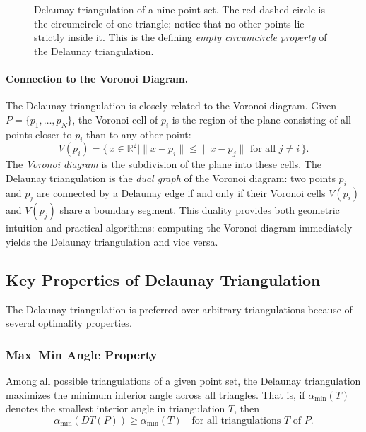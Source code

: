 \begin{figure}[htbp]
    \caption{Delaunay triangulation of a nine-point set.  The red dashed circle
    is the circumcircle of one triangle; notice that no other points lie
    strictly inside it.  This is the defining \emph{empty circumcircle property}
    of the Delaunay triangulation.}
    \label{fig:delaunay-circumcircle}
\end{figure}

\paragraph{Connection to the Voronoi Diagram.}
The Delaunay triangulation is closely related to the Voronoi diagram.
Given $P = \{p_1, \dots, p_N\}$, the Voronoi cell of $p_i$ is the region of
the plane consisting of all points closer to $p_i$ than to any other point:
\[
    V(p_i) = \{\, x \in \mathbb{R}^2 \mid \|x - p_i\| \leq \|x - p_j\|
    \text{ for all } j \neq i \,\}.
\]
The \emph{Voronoi diagram} is the subdivision of the plane into these cells.
The Delaunay triangulation is the \emph{dual graph} of the Voronoi diagram:
two points $p_i$ and $p_j$ are connected by a Delaunay edge if and only if
their Voronoi cells $V(p_i)$ and $V(p_j)$ share a boundary segment.  This
duality provides both geometric intuition and practical algorithms: computing
the Voronoi diagram immediately yields the Delaunay triangulation and vice versa.

\subsection{Key Properties of Delaunay Triangulation}

The Delaunay triangulation is preferred over arbitrary triangulations because
of several optimality properties.

\subsubsection*{Max--Min Angle Property}

\begin{theorem}
    Among all possible triangulations of a given point set, the Delaunay
    triangulation maximizes the minimum interior angle across all triangles.
    That is, if $\alpha_{\min}(T)$ denotes the smallest interior angle in
    triangulation $T$, then
    \[
        \alpha_{\min}(DT(P)) \geq \alpha_{\min}(T)
        \quad \text{for all triangulations } T \text{ of } P.
    \]
\end{theorem}

